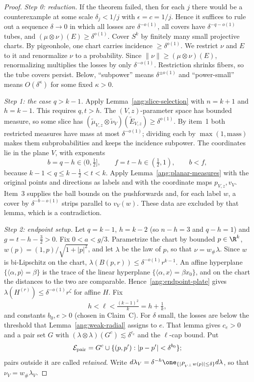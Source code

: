 \documentclass[11pt,reqno]{amsart}
\begin{document}
\begin{proof}
\emph{Step 0: reduction.} If the theorem failed, then for each $j$ there would be a counterexample at some scale $\delta_j<1/j$ with $\epsilon=c=1/j$. Hence it suffices to rule out a sequence $\delta\to0$ in which all losses are $\delta^{-o(1)}$, all covers have $\delta^{-q-o(1)}$ tubes, and $(\mu\otimes\nu)(E)\ge\delta^{o(1)}$. Cover $S^k$ by finitely many small projective charts. By pigeonhole, one chart carries incidence $\ge\delta^{o(1)}$. We restrict $\nu$ and $E$ to it and renormalize $\nu$ to a probability. Since $\|\nu\|\ge(\mu\otimes\nu)(E)$, renormalizing multiplies the losses by only $\delta^{-o(1)}$. Restriction shrinks fibers, so the tube covers persist. Below, ``subpower'' means $\delta^{\pm o(1)}$ and ``power-small'' means $O(\delta^{\kappa})$ for some fixed $\kappa>0$.

\emph{Step 1: the case $q>k-1$.} Apply Lemma~\ref{ang:slice-selection} with $n=k+1$ and $h=k-1$. This requires $q,t>h$. The $(V,z)$-parameter space has bounded measure, so some slice has $(\widetilde\mu_{V,z}\otimes\widetilde\nu_V)(\widetilde E_{V,z})\ge\delta^{o(1)}$. By item~1 both restricted measures have mass at most $\delta^{-o(1)}$; dividing each by $\max(1,\text{mass})$ makes them subprobabilities and keeps the incidence subpower. The coordinates lie in the plane $V$, with exponents
\[
 b=q-h\in(0,\tfrac12],\qquad f=t-h\in(\tfrac12,1),\qquad b<f,
\]
because $k-1<q\le k-\frac12<t<k$. Apply Lemma~\ref{ang:planar-measures} with the original points and directions as labels and with the coordinate maps $p_{V,z},v_V$. Item~3 supplies the ball bounds on the pushforwards and, for each label $w$, a cover by $\delta^{-b-o(1)}$ strips parallel to $v_V(w)$. These data are excluded by that lemma, which is a contradiction.

\emph{Step 2: endpoint setup.} Let $q=k-1$, $h=k-2$ (so $n-h=3$ and $q-h=1$) and $g=t-h-\frac32>0$. Fix $0<a<g/3$. Parametrize the chart by bounded $p\in\R^k$, $w(p)=(1,p)/\sqrt{1+|p|^2}$, and let $\lambda$ be the law of $p$, so that $\nu=w_\#\lambda$. Since $w$ is bi-Lipschitz on the chart, $\lambda(B(p,r))\le\delta^{-o(1)}r^{k-1}$. An affine hyperplane $\{\langle\alpha,p\rangle=\beta\}$ is the trace of the linear hyperplane $\{\langle\alpha,x\rangle=\beta x_0\}$, and on the chart the distances to the two are comparable. Hence~\eqref{ang:endpoint-plate} gives $\lambda(H^{(r)})\le\delta^{-o(1)}r^\zeta$ for affine $H$. Fix
\[
 h<\ell<\tfrac{(k-1)^2}{k}=h+\tfrac1k,
\]
and constants $b_0,e>0$ (chosen in Claim~C). For $\delta$ small, the losses are below the threshold that Lemma~\ref{ang:weak-radial} assigns to $e$. That lemma gives $c_e>0$ and a pair set $G$ with $(\lambda\otimes\lambda)(G^c)\lesssim\delta^{c_e}$ and the $\ell$-cap bound. Put
\[
 \mathcal E_{\rm pair}=G^c\cup\{(p,p'):|p-p'|<\delta^{b_0}\};
\]
pairs outside it are called \emph{retained}. Write $d\lambda_V=\delta^{-h}\one_{\{|P_{V^\perp}w(p)|\le\delta\}}d\lambda$, so that $\nu_V=w_\#\lambda_V$.


\end{proof}
\end{document}
